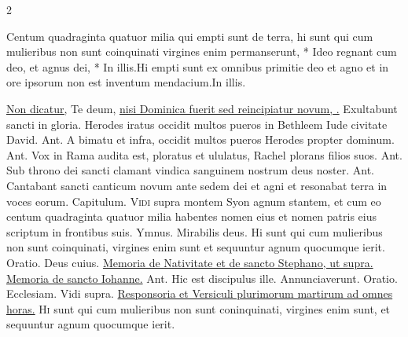 \begin{multicols*}{2}
\begin{responsory-final}
{Centum quadraginta quatuor milia qui empti sunt de terra, hi sunt qui cum mulieribus non sunt coinquinati virgines enim permanserunt, * Ideo regnant cum deo, et agnus dei, * In illis.}{Hi empti sunt ex omnibus primitie deo et agno et in ore ipsorum non est inventum mendacium.}{In illis.}
\end{responsory-final}%
\newline \ul{Non dicatur,} Te deum, \ul{nisi Dominica fuerit sed reincipiatur novum, \Rbar .}
\newline \V Exultabunt sancti in gloria.
 Herodes iratus occidit multos pueros in Bethleem Iude civitate David. {\color{Red} Ant.} A bimatu et infra, occidit multos pueros Herodes propter dominum. {\color{Red} Ant.} Vox in Rama audita est, ploratus et ululatus, Rachel plorans filios suos. {\color{Red} Ant.} Sub throno dei sancti clamant vindica sanguinem nostrum deus noster. {\color{Red} Ant.} Cantabant sancti canticum novum ante sedem dei et agni et resonabat terra in voces eorum. {\color{Red} Capitulum.}
\lettrine[lines=2]{\zallmancaps \color{Red} V}{idi} supra montem Syon agnum stantem, et cum eo centum quadraginta quatuor milia habentes nomen eius et nomen patris eius scriptum in frontibus suis. {\color{Red} Ymnus.}
\newline \V Mirabilis deus.
 Hi sunt qui cum mulieribus non sunt coinquinati, virgines enim sunt et sequuntur agnum quocumque ierit. {\color{Red} Oratio.} Deus cuius.
\newline \ul{Memoria de Nativitate et de sancto Stephano, ut supra. Memoria de sancto Iohanne.} {\color{Red} Ant.} Hic est discipulus ille. \V Annunciaverunt. {\color{Red} Oratio.} Ecclesiam.
 Vidi supra. \ul{Responsoria et Versiculi plurimorum martirum ad omnes horas.}
\lettrine[lines=2]{\zallmancaps \color{Red} H}{i} sunt qui cum mulieribus non sunt coninquinati, virgines enim sunt, et sequuntur agnum quocumque ierit.

\end{multicols*}
